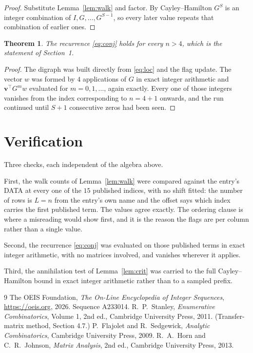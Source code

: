 \documentclass[11pt,a4paper]{article}
\theoremstyle{plain}
\newtheorem{theorem}{Theorem}
\theoremstyle{definition}
\begin{document}
\begin{proof}
Substitute Lemma~\ref{lem:walk} and factor. By Cayley--Hamilton $G^{S}$ is an integer
combination of $I,G,\dots,G^{S-1}$, so every later value repeats that combination of earlier
ones.
\end{proof}

\begin{theorem}
The recurrence \eqref{eq:conj} holds for every $n>4$, which is the statement of
Section~1.
\end{theorem}

\begin{proof}
The digraph was built directly from \eqref{eq:loc} and the flag update. The vector $w$ was
formed by $4$ applications of $G$ in exact integer arithmetic and
$\mathbf{v}^{\!\top}G^{m}w$ evaluated for $m=0,1,\dots$, again exactly. Every one of
those integers vanishes from the index corresponding to $n=4+1$ onwards, and the run
continued until $S+1$ consecutive zeros had been seen.
\end{proof}

\section{Verification}

Three checks, each independent of the algebra above.

First, the walk counts of Lemma~\ref{lem:walk} were compared against the entry's DATA at
every one of the $15$ published indices, with no shift fitted: the number of rows is
$L=n$ from the entry's own name and the offset says which index carries the first
published term. The values agree exactly. The ordering clause is where a misreading would
show first, and it is the reason the flags are per column rather than a single value.

Second, the recurrence \eqref{eq:conj} was evaluated on those published terms in exact
integer arithmetic, with no matrices involved, and vanishes wherever it applies.

Third, the annihilation test of Lemma~\ref{lem:crit} was carried to the full
Cayley--Hamilton bound in exact integer arithmetic rather than to a sampled prefix.

\begin{thebibliography}{9}
 The OEIS Foundation, \emph{The On-Line Encyclopedia of Integer
Sequences}, \url{https://oeis.org}, 2026. Sequence A233014.
 R.~P.~Stanley, \emph{Enumerative Combinatorics}, Volume 1, 2nd ed.,
Cambridge University Press, 2011. (Transfer-matrix method, Section 4.7.)
 P.~Flajolet and R.~Sedgewick, \emph{Analytic Combinatorics}, Cambridge
University Press, 2009.
 R.~A.~Horn and C.~R.~Johnson, \emph{Matrix Analysis}, 2nd ed., Cambridge
University Press, 2013.
\end{thebibliography}
\end{document}
